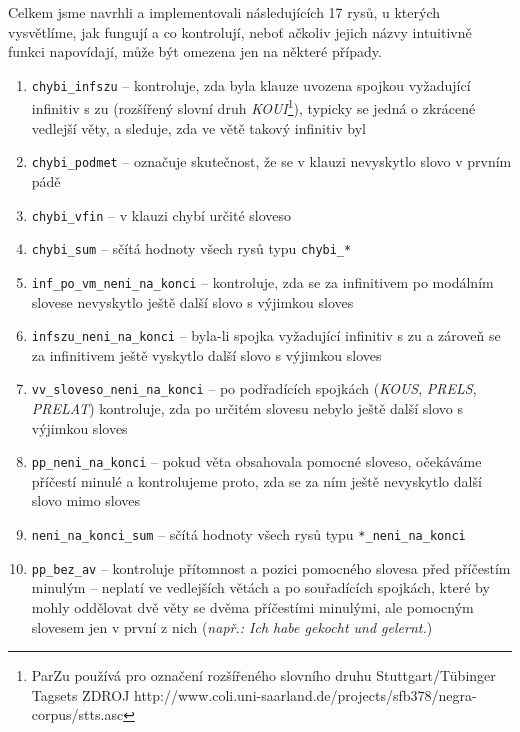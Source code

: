 \documentclass[12pt,a4paper]{report}
\begin{document}
Celkem jsme navrhli a implementovali následujících 17 rysů, u kterých vysvětlíme, jak fungují a co kontrolují, neboť ačkoliv jejich názvy intuitivně funkci napovídají, může být omezena jen na některé případy.
\begin{enumerate}
\item{\texttt{chybi\_infszu} -- kontroluje, zda byla klauze uvozena spojkou vyžadující infinitiv s zu (rozšířený slovní druh \textit{KOUI}\footnote{ParZu používá pro označení rozšířeného slovního druhu Stuttgart/Tübinger Tagsets ZDROJ http://www.coli.uni-saarland.de/projects/sfb378/negra-corpus/stts.asc}), typicky se jedná o zkrácené vedlejší věty, a sleduje, zda ve větě takový infinitiv byl}
\item{\texttt{chybi\_podmet} -- označuje skutečnost, že se v klauzi nevyskytlo slovo v prvním pádě}
\item{\texttt{chybi\_vfin} -- v klauzi chybí určité sloveso}
\item{\texttt{chybi\_sum} -- sčítá hodnoty všech rysů typu \texttt{chybi\_*}}
\item{\texttt{inf\_po\_vm\_neni\_na\_konci} -- kontroluje, zda se za infinitivem po modálním slovese nevyskytlo ještě další slovo s výjimkou sloves}
\item{\texttt{infszu\_neni\_na\_konci} -- byla-li spojka vyžadující infinitiv s zu a zároveň se za infinitivem ještě vyskytlo další slovo s výjimkou sloves}
\item{\texttt{vv\_sloveso\_neni\_na\_konci} -- po podřadících spojkách (\textit{KOUS}, \textit{PRELS}, \textit{PRELAT}) kontroluje, zda po určitém slovesu nebylo ještě další slovo s výjimkou sloves}
\item{\texttt{pp\_neni\_na\_konci} -- pokud věta obsahovala pomocné sloveso, očekáváme příčestí minulé a kontrolujeme proto, zda se za ním ještě nevyskytlo další slovo mimo sloves}
\item{\texttt{neni\_na\_konci\_sum} -- sčítá hodnoty všech rysů typu \texttt{*\_neni\_na\_konci}}
\item{\texttt{pp\_bez\_av} -- kontroluje přítomnost a pozici pomocného slovesa před příčestím minulým -- neplatí ve vedlejších větách a po souřadících spojkách, které by mohly oddělovat dvě věty se dvěma příčestími minulými, ale pomocným slovesem jen v první z nich (\textit{např.: Ich habe gekocht und gelernt.})}




\end{enumerate}
\end{document}
